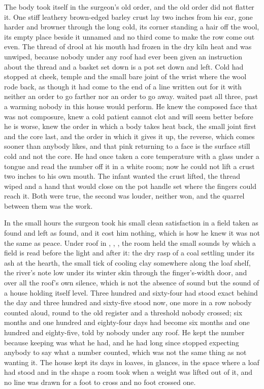 The body took itself in the surgeon's old order, and the old order did not flatter it. One stiff leathery brown-edged barley crust lay two inches from his ear, gone harder and browner through the long cold, its corner standing a hair off the wool, its empty place beside it unnamed and no third come to make the row come out even. The thread of drool at his mouth had frozen in the dry kiln heat and was unwiped, because nobody under any roof had ever been given an instruction about the thread and a basket set down is a pot set down and left. Cold had stopped at cheek, temple and the small bare joint of the wrist where the wool rode back, as though it had come to the end of a line written out for it with neither an order to go farther nor an order to go away.  waited past all three, past a warming nobody in this house would perform. He knew the composed face that was not composure, knew a cold patient cannot clot and will seem better before he is worse, knew the order in which a body takes heat back, the small joint first and the core last, and the order in which it gives it up, the reverse, which comes sooner than anybody likes, and that pink returning to a face is the surface still cold and not the core. He had once taken a core temperature with a glass under a tongue and read the number off it in a white room; now he could not lift a crust two inches to his own mouth. The infant wanted the crust lifted, the thread wiped and a hand that would close on the pot handle set where the fingers could reach it. Both were true, the second was louder, neither won, and the quarrel between them was the work.

\scenebreak

In the small hours the surgeon took his small clean satisfaction in a field taken as found and left as found, and it cost him nothing, which is how he knew it was not the same as peace. Under  roof in , , , the room held the small sounds by which a field is read before the light and after it: the dry rasp of a coal settling under its ash at the hearth, the small tick of cooling clay somewhere along the loaf shelf, the river's note low under its winter skin through the finger's-width door, and over all the roof's own silence, which is not the absence of sound but the sound of a house holding itself level. Three hundred and sixty-four had stood exact behind the day and three hundred and sixty-five stood now, one more in a row nobody counted aloud, round to the old register and a threshold nobody crossed; six months and one hundred and eighty-four days had become six months and one hundred and eighty-five, told by nobody under any roof. He kept the number because keeping was what he had, and he had long since stopped expecting anybody to say what a number counted, which was not the same thing as not wanting it. The house kept its days in loaves, in glances, in the space where a loaf had stood and in the shape a room took when a weight was lifted out of it, and no line was drawn for a foot to cross and no foot crossed one.

